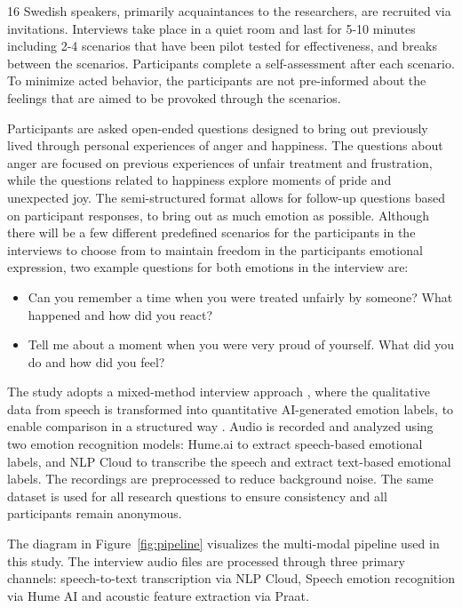 16 Swedish speakers, primarily acquaintances to the researchers, are recruited via invitations. Interviews take place in a quiet room and last for 5-10 minutes including 2-4 scenarios that have been pilot tested for effectiveness, and breaks between the scenarios. Participants complete a self-assessment after each scenario. To minimize acted behavior, the participants are not pre-informed about the feelings that are aimed to be provoked through the scenarios.

Participants are asked open-ended questions designed to bring out previously lived through personal experiences of anger and happiness. The questions about anger are focused on previous experiences of unfair treatment and frustration, while the questions related to happiness explore moments of pride and unexpected joy. The semi-structured format allows for follow-up questions based on participant responses, to bring out as much emotion as possible.
Although there will be a few different predefined scenarios for the participants in the interviews to choose from to maintain freedom in the participants emotional expression, two example questions for both emotions in the interview are:
\begin{itemize}
    \item Can you remember a time when you were treated unfairly by someone? What happened and how did you react?
    \item Tell me about a moment when you were very proud of yourself. What did you do and how did you feel?
\end{itemize}
The study adopts a mixed-method interview approach \autocite{Bryman2022}, where the qualitative data from speech is transformed into quantitative AI-generated emotion labels, to enable comparison in a structured way \autocite{Creswell2023}.
Audio is recorded and analyzed using two emotion recognition models: Hume.ai to extract speech-based emotional labels, and NLP Cloud to transcribe the speech and extract text-based emotional labels. The recordings are preprocessed to reduce background noise. The same dataset is used for all research questions to ensure consistency and all participants remain anonymous.

The diagram in Figure~\ref{fig:pipeline} visualizes the multi-modal pipeline used in this study.  
The interview audio files are processed through three primary channels: speech-to-text transcription via NLP Cloud,  
Speech emotion recognition via Hume AI and acoustic feature extraction via Praat.  

